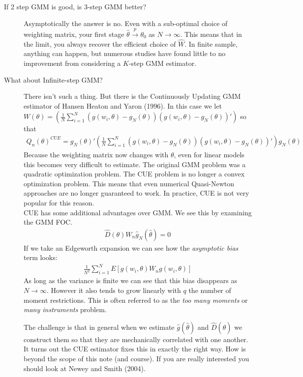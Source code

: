 \documentclass[a4paper]{article}
\begin{document}
\begin{description}
\item[If 2 step GMM is good, is 3-step GMM better?] Asymptotically the answer is no. Even with a sub-optimal choice of weighting matrix, your first stage  $\hat{\theta} \overset{p}{\to}\theta_0$ as $N \rightarrow \infty$. This means that in the limit, you always recover the efficient choice of $\hat{W}$. In finite sample, anything can happen, but numerous studies have found little to no improvement from considering a $K$-step GMM estimator.
\item[What about Infinite-step GMM?] There isn't such a thing. But there is the Continuously Updating GMM estimator of Hansen Heaton and Yaron (1996). In this case we let \\$W(\theta)=\left(\frac{1}{N} \sum_{i=1}^N (g(w_i,\theta) - g_N(\theta)) (g(w_i,\theta)-g_N(\theta))' \right)$ so that
\begin{eqnarray*}
Q_n(\theta)^{CUE} = g_N(\theta)' \left(\frac{1}{N} \sum_{i=1}^N (g(w_i,\theta) - g_N(\theta)) (g(w_i,\theta)-g_N(\theta))' \right) g_N(\theta)
\end{eqnarray*}
Because the weighting matrix now changes with $\theta$, even for linear models this becomes very difficult to estimate. The original GMM problem was a quadratic optimization problem. The CUE problem is no longer a convex optimization problem. This means that even numerical Quasi-Newton approaches are no longer guaranteed to work. In practice, CUE is not very popular for this reason.\\

CUE has some additional advantages over GMM. We see this by examining the GMM FOC. 
\begin{eqnarray*}
\hat{D}(\theta) W_n \hat{g}_N(\hat{\theta}) =0
\end{eqnarray*}
If we take an Edgeworth expansion we can see how the  \textit{asymptotic bias} term looks:
\begin{eqnarray*}
\frac{1}{N^2}\sum_{i=1}^N E[g(w_i,\theta) W_n g(w_i,\theta)]
\end{eqnarray*}
As long as the variance is finite we can see that this bias disappears as $N \rightarrow \infty$. However it also tends to grow linearly with $q$ the number of moment restrictions. This is often referred to as the \textit{too many moments} or \textit{many instruments} problem.

The challenge is that in general when we estimate $\hat{g}(\hat{\theta})$ and $\hat{D}(\hat{\theta})$ we construct them so that they are mechanically correlated with one another. It turns out the CUE estimator fixes this in exactly the right way. How is beyond the scope of this note (and course). If you are really interested you should look at Newey and Smith (2004).

\end{description}
\end{document}
